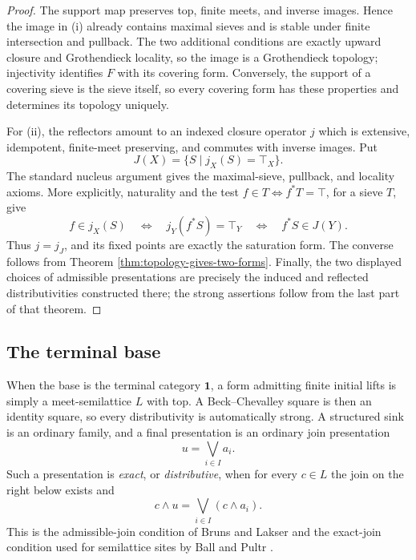 \documentclass[12pt,oneside,reqno]{amsart}
\theoremstyle{definition}
\theoremstyle{remark}
\begin{document}
\begin{proof}
The support map preserves top, finite meets, and inverse images.  Hence
the image in \textup{(i)} already contains maximal sieves and is stable
under finite intersection and pullback.  The two additional conditions
are exactly upward closure and Grothendieck locality, so the image is a
Grothendieck topology; injectivity identifies \(F\) with its covering
form.  Conversely, the support of a covering sieve is the sieve itself,
so every covering form has these properties and determines its topology
uniquely.

For \textup{(ii)}, the reflectors amount to an indexed closure operator
\(j\) which is extensive, idempotent, finite-meet preserving, and
commutes with inverse images.  Put
\[
                         J(X)=\{S\mid j_X(S)=\top_X\}.
\]
The standard nucleus argument gives the maximal-sieve, pullback, and
locality axioms.  More explicitly, naturality and the test
\(f\in T\iff f^*T=\top\), for a sieve \(T\), give
\[
 f\in j_X(S)
 \quad\Longleftrightarrow\quad
 j_Y(f^*S)=\top_Y
 \quad\Longleftrightarrow\quad f^*S\in J(Y).
\]
Thus \(j=j_J\), and its fixed points are exactly the saturation form.
The converse follows from Theorem
\ref{thm:topology-gives-two-forms}.  Finally, the two displayed choices
of admissible presentations are precisely the induced and reflected
distributivities constructed there; the strong assertions follow from
the last part of that theorem.
\end{proof}

\subsection{The terminal base}

When the base is the terminal category \(\mathbf1\), a form admitting
finite initial lifts is simply a meet-semilattice \(L\) with top.  A
Beck--Chevalley square is then an identity square, so every
distributivity is automatically strong.  A
structured sink is an ordinary family, and a final presentation is an
ordinary join presentation
\[
                         u=\bigvee_{i\in I}a_i.
\]
Such a presentation is \emph{exact}, or \emph{distributive}, when for
every \(c\in L\) the join on the right below exists and
\begin{equation}\label{eq:exact-join}
              c\wedge u=\bigvee_{i\in I}(c\wedge a_i).
\end{equation}
This is the admissible-join condition of Bruns and Lakser
\cite{BrunsLakser} and the exact-join condition used for semilattice
sites by Ball and Pultr \cite{BallPultr}.
\end{document}
